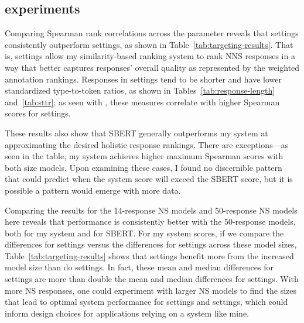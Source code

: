 \subsection{ experiments}
\label{sec:exp-targeting}

Comparing Spearman rank correlations across the  parameter reveals that  settings consistently outperform  settings, as shown in Table~\ref{tab:targeting-results}. That is,  settings allow my similarity-based ranking system to rank NNS responses in a way that better captures responses' overall quality as represented by the weighted annotation rankings. Responses in  settings tend to be shorter and have lower standardized type-to-token ratios, as shown in Tables~\ref{tab:response-length} and~\ref{tab:sttr}; as seen with , these measures correlate with higher Spearman scores for  settings.

These results also show that SBERT generally outperforms my system at approximating the desired holistic response rankings. There are exceptions---as seen in the table, my system achieves higher maximum Spearman scores with both size models. Upon examining these cases, I found no discernible pattern that could predict when the system score will exceed the SBERT score, but it is possible a pattern would emerge with more data.

Comparing the results for the 14-response NS models and 50-response NS models here reveals that performance is consistently better with the 50-response models, both for my system and for SBERT. For my system scores, if we compare the differences for  settings versus the differences for  settings across these model sizes, Table~\ref{tab:targeting-results} shows that  settings benefit more from the increased model size than do  settings. In fact, these mean and median differences for  settings are more than double the mean and median differences for  settings.
With more NS responses, one could experiment with larger NS models to find the sizes that lead to optimal system performance for  settings and  settings, which could inform design choices for applications relying on a system like mine.

